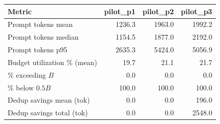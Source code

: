 \begin{tabular}{lrrr}
\toprule
Metric & pilot\_p1 & pilot\_p2 & pilot\_p3 \\
\midrule
Prompt tokens mean & 1236.3 & 1963.0 & 1992.2 \\
Prompt tokens median & 1154.5 & 1877.0 & 2192.0 \\
Prompt tokens p95 & 2635.3 & 5424.0 & 5056.9 \\
Budget utilization \% (mean) & 19.7 & 21.1 & 21.7 \\
\% exceeding $B$ & 0.0 & 0.0 & 0.0 \\
\% below $0.5B$ & 100.0 & 100.0 & 100.0 \\
Dedup savings mean (tok) & 0.0 & 0.0 & 196.0 \\
Dedup savings total (tok) & 0.0 & 0.0 & 2548.0 \\
\bottomrule
\end{tabular}
